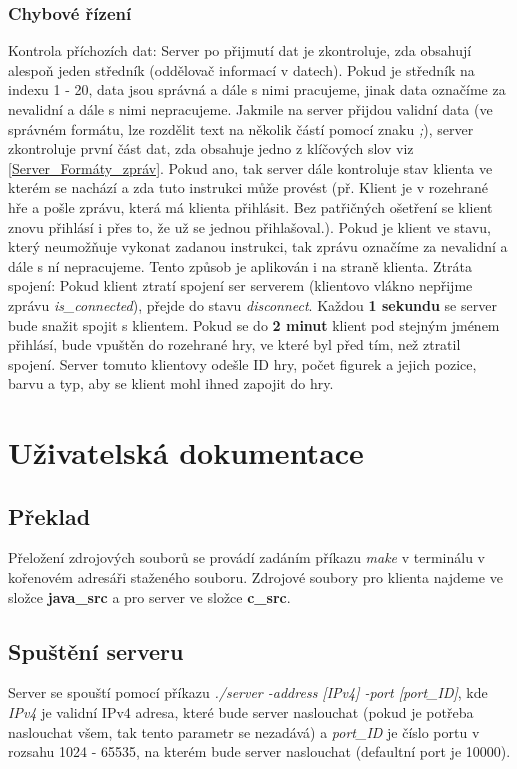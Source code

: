 \documentclass[12pt, a4paper]{article}
\begin{document}
\subsubsection{Chybové řízení}
\label{Chybove_rizeni}
Kontrola příchozích dat: Server po přijmutí dat je zkontroluje, zda obsahují alespoň jeden středník (oddělovač informací v datech). Pokud je středník na indexu 1 - 20, data jsou správná a dále s nimi pracujeme, jinak data označíme za nevalidní a dále s nimi nepracujeme.
\newline
Jakmile na server přijdou validní data (ve správném formátu, lze rozdělit text na několik částí pomocí znaku \textit{;}), server zkontroluje první část dat, zda obsahuje jedno z klíčových slov viz \ref{Server_Formáty_zpráv}. Pokud ano, tak server dále kontroluje stav klienta ve kterém se nachází a zda tuto instrukci může provést (př. Klient je v rozehrané hře a pošle zprávu, která má klienta přihlásit. Bez patřičných ošetření se klient znovu přihlásí i přes to, že už se jednou přihlašoval.). Pokud je klient ve stavu, který neumožňuje vykonat zadanou instrukci, tak zprávu označíme za nevalidní a dále s ní nepracujeme. Tento způsob je aplikován i na straně klienta.
\newline
Ztráta spojení: Pokud klient ztratí spojení ser serverem (klientovo vlákno nepřijme zprávu \textit{is\_connected}), přejde do stavu \textit{disconnect}. Každou \textbf{1 sekundu} se server bude snažit spojit s klientem. Pokud se do \textbf{2 minut} klient pod stejným jménem přihlásí, bude vpuštěn do rozehrané hry, ve které byl před tím, než ztratil spojení. Server tomuto klientovy odešle ID hry, počet figurek a jejich pozice, barvu a typ, aby se klient mohl ihned zapojit do hry.
\section{Uživatelská dokumentace}
\label{Uživatelská_dokumentace}
\subsection{Překlad}
\label{Překlad}
Přeložení zdrojových souborů se provádí zadáním příkazu \textit{make} v terminálu v kořenovém adresáři staženého souboru. Zdrojové soubory pro klienta najdeme ve složce \textbf{\/java\_src\/} a pro server ve složce \textbf{\/c\_src\/}.
\subsection{Spuštění serveru}
\label{Spuštění_serveru}
Server se spouští pomocí příkazu \textit{./server -address [IPv4] -port [port\_ID]}, kde \textit{IPv4} je validní IPv4 adresa, které bude server naslouchat (pokud je potřeba naslouchat všem, tak tento parametr se nezadává) a \textit{port\_ID} je číslo portu v rozsahu 1024 - 65535, na kterém bude server naslouchat (defaultní port je 10000). 
\end{document}
